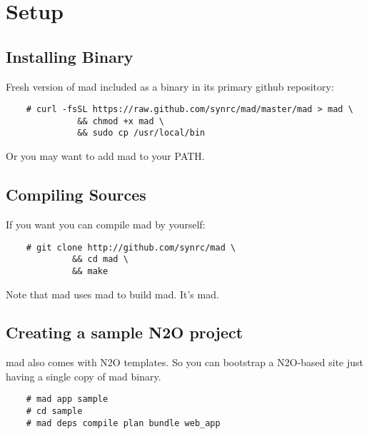 \section{Setup}

\subsection{Installing Binary}

Fresh version of mad included as a binary in its primary github repository:

\vspace{1\baselineskip}
\begin{lstlisting}
    # curl -fsSL https://raw.github.com/synrc/mad/master/mad > mad \
              && chmod +x mad \
              && sudo cp /usr/local/bin
\end{lstlisting}
\vspace{1\baselineskip}

Or you may want to add mad to your PATH.

\subsection{Compiling Sources}

If you want you can compile mad by yourself:

\vspace{1\baselineskip}
\begin{lstlisting}
    # git clone http://github.com/synrc/mad \
             && cd mad \
             && make
\end{lstlisting}
\vspace{1\baselineskip}

Note that mad uses mad to build mad. It's mad.

\subsection{Creating a sample N2O project}

mad also comes with N2O templates. So you can bootstrap a N2O-based site
just having a single copy of mad binary.

\vspace{1\baselineskip}
\begin{lstlisting}
    # mad app sample
    # cd sample
    # mad deps compile plan bundle web_app
\end{lstlisting}
\vspace{1\baselineskip}

